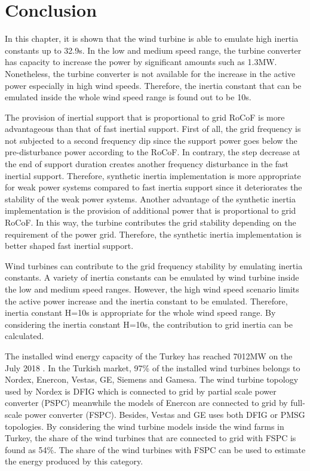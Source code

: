 \section{Conclusion}
In this chapter, it is shown that the wind turbine is able to emulate high inertia constants up to 32.9s. In the low and medium speed range, the turbine converter has capacity to increase the power by significant amounts such as 1.3MW. Nonetheless, the turbine converter is not available for the increase in the active power especially in high wind speeds. Therefore, the inertia constant that can be emulated inside the whole wind speed range is found out to be 10s. \par
The provision of inertial support that is proportional to grid RoCoF is more advantageous than that of fast inertial support. First of all, the grid frequency is not subjected to a second frequency dip since the support power goes below the pre-disturbance power according to the RoCoF. In contrary, the step decrease at the end of support duration creates another frequency disturbance in the fast inertial support. Therefore, synthetic inertia implementation is more appropriate for weak power systems compared to fast inertia support since it deteriorates the stability of the weak power systems. Another advantage of the synthetic inertia implementation is the provision of additional power that is proportional to grid RoCoF. In this way, the turbine contributes the grid stability depending on the requirement of the power grid. Therefore, the synthetic inertia implementation is better shaped fast inertial support.\par
Wind turbines can contribute to the grid frequency stability by emulating inertia constants. A variety of inertia constants can be emulated by wind turbine inside the low and medium speed ranges. However, the high wind speed scenario limits the active power increase and the inertia constant to be emulated. Therefore, inertia constant H=10s is appropriate for the whole wind speed range. By considering the inertia constant H=10s, the contribution to grid inertia can be calculated. \par
The installed wind energy capacity of the Turkey has reached 7012MW on the July 2018 \cite{July2018}. In the Turkish market, 97\% of the installed wind turbines belongs to Nordex, Enercon, Vestas, GE, Siemens and Gamesa. The wind turbine topology used by Nordex is DFIG which is connected to grid by partial scale power converter (PSPC) meanwhile the models of Enercon are connected to grid by full-scale power converter (FSPC). Besides, Vestas and GE uses both DFIG or PMSG topologies. By considering the wind turbine models inside the wind farms in Turkey, the share of the wind turbines that are connected to grid with FSPC is found as 54\%. The share of the wind turbines with FSPC can be used to estimate the energy produced by this category. \par
